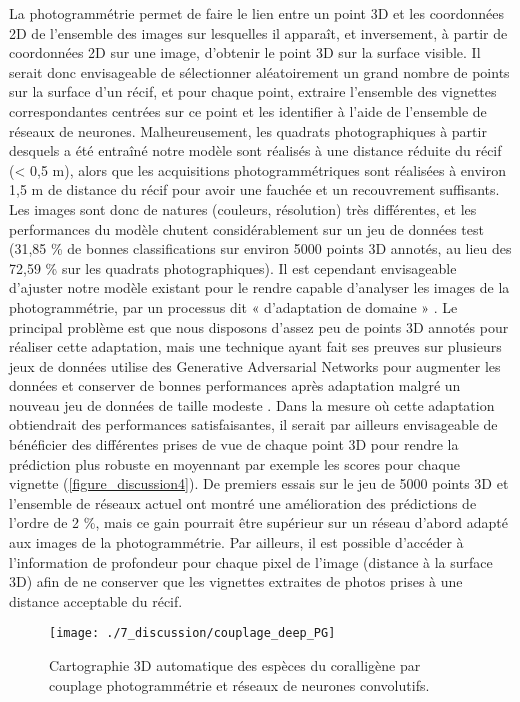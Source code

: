 La photogrammétrie permet de faire le lien entre un point 3D et les coordonnées 2D de l’ensemble des images sur lesquelles il apparaît, et inversement, à partir de coordonnées 2D sur une image, d’obtenir le point 3D sur la surface visible. Il serait donc envisageable de sélectionner aléatoirement un grand nombre de points sur la surface d’un récif, et pour chaque point, extraire l’ensemble des vignettes correspondantes centrées sur ce point et les identifier à l’aide de l’ensemble de réseaux de neurones. Malheureusement, les quadrats photographiques à partir desquels a été entraîné notre modèle sont réalisés à une distance réduite du récif (< 0,5 m), alors que les acquisitions photogrammétriques sont réalisées à environ 1,5 m de distance du récif pour avoir une fauchée et un recouvrement suffisants. Les images sont donc de natures (couleurs, résolution) très différentes, et les performances du modèle chutent considérablement sur un jeu de données test (31,85 \% de bonnes classifications sur environ 5000 points 3D annotés, au lieu des 72,59 \% sur les quadrats photographiques). Il est cependant envisageable d’ajuster notre modèle existant pour le rendre capable d’analyser les images de la photogrammétrie, par un processus dit « d’adaptation de domaine » \citep{goodfellow_deep_2016}. Le principal problème est que nous disposons d’assez peu de points 3D annotés pour réaliser cette adaptation, mais une technique ayant fait ses preuves sur plusieurs jeux de données utilise des Generative Adversarial Networks pour augmenter les données et conserver de bonnes performances après adaptation malgré un nouveau jeu de données de taille modeste \citep{antoniou_data_2018}. Dans la mesure où cette adaptation obtiendrait des performances satisfaisantes, il serait par ailleurs envisageable de bénéficier des différentes prises de vue de chaque point 3D pour rendre la prédiction plus robuste en moyennant par exemple les scores pour chaque vignette (\autoref{figure_discussion4}). De premiers essais sur le jeu de 5000 points 3D et l’ensemble de réseaux actuel ont montré une amélioration des prédictions de l’ordre de 2 \%, mais ce gain pourrait être supérieur sur un réseau d’abord adapté aux images de la photogrammétrie. Par ailleurs, il est possible d’accéder à l’information de profondeur pour chaque pixel de l’image (distance à la surface 3D) afin de ne conserver que les vignettes extraites de photos prises à une distance acceptable du récif.

\begin{sidewaysfigure}
\begin{figure}[H]
	\begin{center}
	\texttt{[image: ./7\_discussion/couplage\_deep\_PG]}
		\caption{Cartographie 3D automatique des espèces du coralligène par couplage photogrammétrie et réseaux de neurones convolutifs.}
	\label{figure_discussion4}
\end{center}
\end{figure}
\end{sidewaysfigure}

